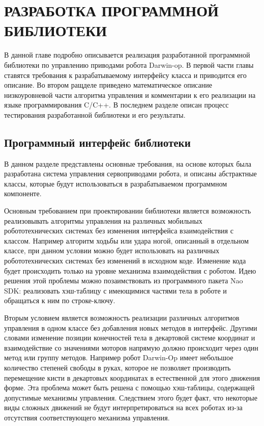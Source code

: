 \chapter{РАЗРАБОТКА ПРОГРАММНОЙ БИБЛИОТЕКИ}

В данной главе подробно описывается реализация разработанной программной библиотеки по управлению приводами робота Darwin-op. В первой части главы ставятся требования к разрабатываемому интерфейсу класса и приводится его описание. Во втором ращделе приведено математическое описание низкоуровневой части алгоритма управления и комментарии к его реализации на языке программирования C/C++. В последнем разделе описан процесс тестирования разработанной библиотеки и его результаты.

\section{Программный интерфейс библиотеки}

В данном разделе представлены основные требования, на основе которых была разработана система управления сервоприводами робота, и описаны абстрактные классы, которые будут использоваться в разрабатываемом программном компоненте.

Основным требованием при проектировании библиотеки является возможность реализовывать алгоритмы управления на различных мобильных робототехнических системах без изменения интерфейса взаимодействия с классом. Например алгоритм ходьбы или удара ногой, описанный в отдельном классе, при данном условии можно будет использовать на различных робототехнических системах без изменений в исходном коде. Изменение кода будет происходить только на уровне механизма взаимодействия с роботом. Идею решения этой проблемы можно позаимствовать из программного пакета Nao SDK: реализовать хэш-таблицу с имеющимися частями тела в роботе и обращаться к ним по строке-ключу.

Вторым условием является возможность реализации различных алгоритмов управления в одном классе без добавления новых методов в интерфейс. Другими словами изменение позиции конечностей тела в декартовой системе координат и взаимодействие со значениями моторов напрямую должно происходит через один метод или группу методов. Например робот Darwin-Op имеет небольшое количество степеней свободы в руках, которое не позволяет производить перемещение кисти в декартовых координатах в естественной для этого движения форме. Эта проблема может быть решена с помощью хэш-таблицы, содержащей допустимые механизмы управления. Следствием этого будет факт, что некоторые виды сложных движений не будут интерпретироваться на всех роботах из-за отсутствия соответствующего механизма управления.

